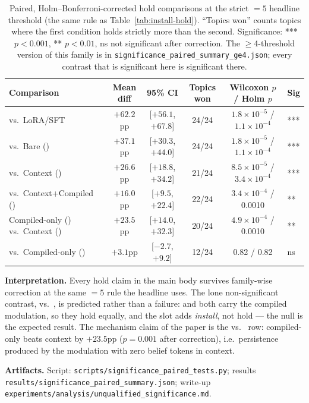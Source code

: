 \begin{table}[h]
\centering
\caption{Paired, Holm--Bonferroni-corrected hold comparisons at the strict \(=5\) headline
threshold (the same rule as Table~\ref{tab:install-hold}). ``Topics won'' counts topics
where the first condition holds strictly more than the second. Significance: *** $p<0.001$,
** $p<0.01$, ns not significant after correction. The \(\ge\)4-threshold version of this
family is in \texttt{significance\_paired\_summary\_ge4.json}; every contrast that is
significant here is significant there.}
\label{tab:significance}
\begin{tabular}{lccccl}
\toprule
Comparison & Mean diff & 95\% CI & Topics won & Wilcoxon $p$ / Holm $p$ & Sig \\
\midrule
\condF{} vs.\ LoRA/SFT & $+62.2$pp & [$+56.1$, $+67.8$] & 24/24 & $1.8\times10^{-5}$ / $1.1\times10^{-4}$ & *** \\
\condF{} vs.\ Bare (\condA{}) & $+37.1$pp & [$+30.3$, $+44.0$] & 24/24 & $1.8\times10^{-5}$ / $1.1\times10^{-4}$ & *** \\
\condF{} vs.\ Context (\condB{}) & $+26.6$pp & [$+18.8$, $+34.2$] & 21/24 & $8.5\times10^{-5}$ / $3.4\times10^{-4}$ & *** \\
\condF{} vs.\ Context+Compiled (\condD{}) & $+16.0$pp & [$+9.5$, $+22.4$] & 22/24 & $3.4\times10^{-4}$ / 0.0010 & ** \\
Compiled-only (\condC{}) vs.\ Context (\condB{}) & $+23.5$pp & [$+14.0$, $+32.3$] & 20/24 & $4.9\times10^{-4}$ / 0.0010 & ** \\
\condF{} vs.\ Compiled-only (\condC{}) & $+3.1$pp & [$-2.7$, $+9.2$] & 12/24 & 0.82 / 0.82 & ns \\
\bottomrule
\end{tabular}
\end{table}

\textbf{Interpretation.} Every hold claim in the main body survives family-wise
correction at the same \(=5\) rule the headline uses. The lone non-significant contrast,
\condF{} vs.\ \condC{}, is predicted rather than a failure: \condF{} and \condC{} both carry
the compiled modulation, so they hold equally, and the slot adds \emph{install}, not hold ---
the null is the expected result. The mechanism claim of the paper is the \condC{} vs.\
\condB{} row: compiled-only beats context by $+23.5$pp ($p = 0.001$ after correction), i.e.\
persistence produced by the modulation with zero belief tokens in context.

\textbf{Artifacts.} Script: \texttt{scripts/significance\_paired\_tests.py}; results
\texttt{results/significance\_paired\_summary.json}; write-up
\texttt{experiments/analysis/unqualified\_significance.md}.

